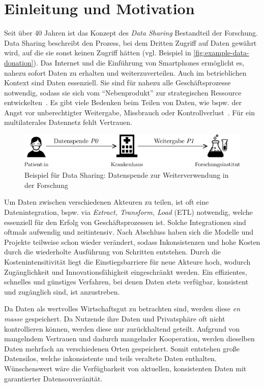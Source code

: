 
\section{Einleitung und Motivation}

Seit über 40 Jahren ist das Konzept des \emph{Data Sharing} Bestandteil der Forschung.
Data Sharing beschreibt den Prozess, bei dem Dritten Zugriff auf Daten gewährt wird, auf die sie sonst keinen Zugriff hätten (vgl. Beispiel in \autoref{fig:example-data-donation}).
Das Internet und die Einführung von Smartphones ermöglicht es, nahezu sofort Daten zu erhalten und weiterzuverteilen.
Auch im betrieblichen Kontext sind Daten essenziell.
Sie sind für nahezu alle Geschäftsprozesse notwendig, sodass sie sich vom \enquote{Nebenprodukt} zur strategischen Ressource entwickelten~\cite{mollerIndustrialDataEcosystems2024}.
Es gibt viele Bedenken beim Teilen von Daten, wie bspw. der Angst vor unberechtigter Weitergabe, Missbrauch oder Kontrollverlust~\cite{mollerIndustrialDataEcosystems2024}.
Für ein multilaterales Datennetz fehlt Vertrauen.

\begin{figure}
    \includegraphics[width=\textwidth]{./assets/example_horizontal.drawio.pdf}
    \caption{Beispiel für Data Sharing: Datenspende zur Weiterverwendung in der Forschung}
    \label{fig:example-data-donation}
\end{figure}

Um Daten zwischen verschiedenen Akteuren zu teilen, ist oft eine Datenintegration, bspw. via \emph{Extract, Transform, Load} (ETL) notwendig, welche essenziell für den Erfolg von Geschäftsprozessen ist.
Solche Integrationen sind oftmals aufwendig und zeitintensiv.
Nach Abschluss haben sich die Modelle und Projekte teilweise schon wieder verändert, sodass Inkonsistenzen und hohe Kosten durch die wiederholte Ausführung von Schritten entstehen.
Durch die Kostenintensitivität liegt die Einstiegsbarriere für neue Akteure hoch, wodurch Zugänglichkeit und Innovationsfähigkeit eingeschränkt werden.
Ein effizientes, schnelles und günstiges Verfahren, bei denen Daten stets verfügbar, konsistent und zugänglich sind, ist anzustreben.

Da Daten als wertvolles Wirtschaftsgut zu betrachten sind, werden diese \emph{en masse} gespeichert.
Da Nutzende ihre Daten und Privatsphäre oft nicht kontrollieren können, werden diese nur zurückhaltend geteilt.
Aufgrund von mangelndem Vertrauen und dadurch mangelnder Kooperation, werden dieselben Daten mehrfach an verschiedenen Orten gespeichert.
Somit entstehen große Datensilos, welche inkonsistente und teils veraltete Daten enthalten.
Wünschenswert wäre die Verfügbarkeit von aktuellen, konsistenten Daten mit garantierter Datensouveränität.

